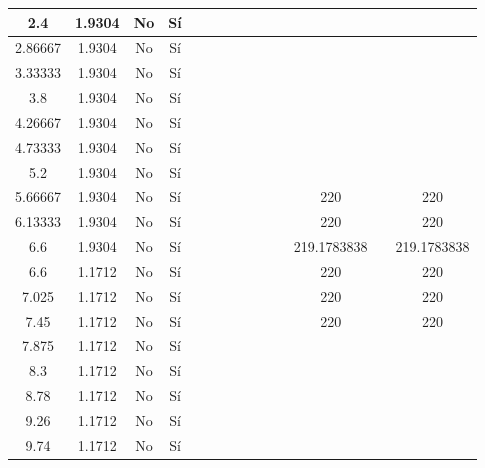 \begin{table}[H]
{\begin{tabular}{|c|c|c|c|c|c|c|c|c|c|c|c|c|c|}
\hline
2.4 & 1.9304 & No  & Sí  &     &     &     &     &     &     &     &     &     &  \bigstrut\\
\hline
2.86667 & 1.9304 & No  & Sí  &     &     &     &     &     &     &     &     &     &  \bigstrut\\
\hline
3.33333 & 1.9304 & No  & Sí  &     &     &     &     &     &     &     &     &     &  \bigstrut\\
\hline
3.8 & 1.9304 & No  & Sí  &     &     &     &     &     &     &     &     &     &  \bigstrut\\
\hline
4.26667 & 1.9304 & No  & Sí  &     &     &     &     &     &     &     &     &     &  \bigstrut\\
\hline
4.73333 & 1.9304 & No  & Sí  &     &     &     &     &     &     &     &     &     &  \bigstrut\\
\hline
5.2 & 1.9304 & No  & Sí  &     &     &     &     &     &     &     &     &     &  \bigstrut\\
\hline
5.66667 & 1.9304 & No  & Sí  &     &     &     &     &     &     &     & 220 &     & 220 \bigstrut\\
\hline
6.13333 & 1.9304 & No  & Sí  &     &     &     &     &     &     &     & 220 &     & 220 \bigstrut\\
\hline
6.6 & 1.9304 & No  & Sí  &     &     &     &     &     &     &     & 219.1783838 &     & 219.1783838 \bigstrut\\
\hline
6.6 & 1.1712 & No  & Sí  &     &     &     &     &     &     &     & 220 &     & 220 \bigstrut\\
\hline
7.025 & 1.1712 & No  & Sí  &     &     &     &     &     &     &     & 220 &     & 220 \bigstrut\\
\hline
7.45 & 1.1712 & No  & Sí  &     &     &     &     &     &     &     & 220 &     & 220 \bigstrut\\
\hline
7.875 & 1.1712 & No  & Sí  &     &     &     &     &     &     &     &     &     &  \bigstrut\\
\hline
8.3 & 1.1712 & No  & Sí  &     &     &     &     &     &     &     &     &     &  \bigstrut\\
\hline
8.78 & 1.1712 & No  & Sí  &     &     &     &     &     &     &     &     &     &  \bigstrut\\
\hline
9.26 & 1.1712 & No  & Sí  &     &     &     &     &     &     &     &     &     &  \bigstrut\\
\hline
9.74 & 1.1712 & No  & Sí  &     &     &     &     &     &     &     &     &     &  \bigstrut\\

\end{tabular}}
\end{table}
